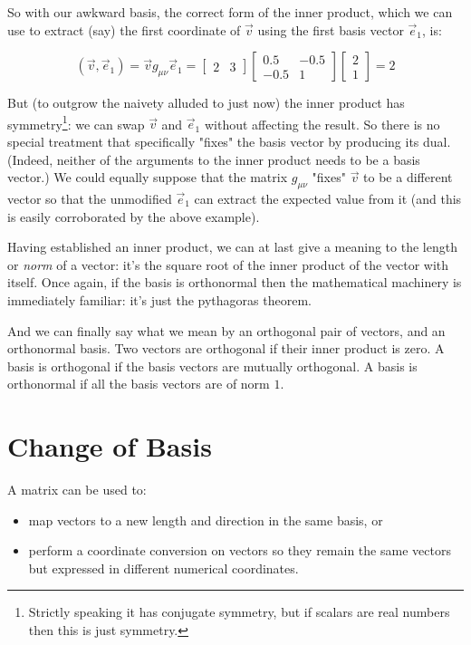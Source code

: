 So with our awkward basis, the correct form of the inner product, which we can use to extract (say) the first coordinate of $\vec{v}$ using the first basis vector $\vec{e}_1$, is:

$$
(\vec{v}, \vec{e}_1) =
\vec{v} g_{\mu\nu} \vec{e}_1 =
\begin{bmatrix}2 & 3\end{bmatrix} 
\begin{bmatrix}0.5 & -0.5 \\ -0.5 & 1\end{bmatrix}
\begin{bmatrix}2 \\ 1\end{bmatrix}
=
2
$$

But (to outgrow the naivety alluded to just now) the inner product has symmetry\footnote{Strictly speaking it has conjugate symmetry, but if scalars are real numbers then this is just symmetry.}: we can swap $\vec{v}$ and $\vec{e}_1$ without affecting the result. So there is no special treatment that specifically "fixes" the basis vector by producing its dual. (Indeed, neither of the arguments to the inner product needs to be a basis vector.) We could equally suppose that the matrix $g_{\mu\nu}$ "fixes" $\vec{v}$ to be a different vector so that the unmodified $\vec{e}_1$ can extract the expected value from it (and this is easily corroborated by the above example).

Having established an inner product, we can at last give a meaning to the length or \textit{norm} of a vector: it's the square root of the inner product of the vector with itself. Once again, if the basis is orthonormal then the mathematical machinery is immediately familiar: it's just the pythagoras theorem.

And we can finally say what we mean by an orthogonal pair of vectors, and an orthonormal basis. Two vectors are orthogonal if their inner product is zero. A basis is orthogonal if the basis vectors are mutually orthogonal. A basis is orthonormal if all the basis vectors are of norm $1$.

\section{Change of Basis}\label{sec:vectors-change-basis}

A matrix can be used to:

\begin{itemize}
    \item map vectors to a new length and direction in the same basis, or
    \item perform a coordinate conversion on vectors so they remain the same vectors but expressed in different numerical coordinates.
\end{itemize}

